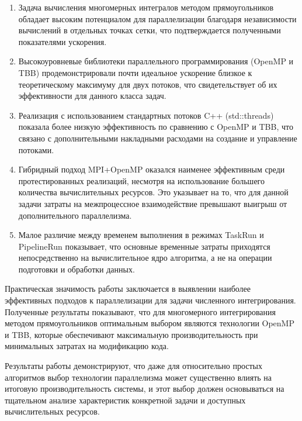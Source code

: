 \documentclass[a4paper,12pt]{article}
\begin{document}
  \begin{enumerate}
    \item Задача вычисления многомерных интегралов методом прямоугольников обладает высоким потенциалом для параллелизации благодаря независимости вычислений в отдельных точках сетки, что подтверждается полученными показателями ускорения.
    \item Высокоуровневые библиотеки параллельного программирования (OpenMP и TBB) продемонстрировали почти идеальное ускорение близкое к теоретическому максимуму для двух потоков, что свидетельствует об их эффективности для данного класса задач.
    \item Реализация с использованием стандартных потоков C++ (std::threads) показала более низкую эффективность по сравнению с OpenMP и TBB, что связано с дополнительными накладными расходами на создание и управление потоками.
    \item Гибридный подход MPI+OpenMP оказался наименее эффективным среди протестированных реализаций, несмотря на использование большего количества вычислительных ресурсов. Это указывает на то, что для данной задачи затраты на межпроцессное взаимодействие превышают выигрыш от дополнительного параллелизма.
    \item Малое различие между временем выполнения в режимах TaskRun и PipelineRun показывает, что основные временные затраты приходятся непосредственно на вычислительное ядро алгоритма, а не на операции подготовки и обработки данных.
  \end{enumerate}

  Практическая значимость работы заключается в выявлении наиболее эффективных подходов к параллелизации для задачи численного интегрирования.
  Полученные результаты показывают, что для многомерного интегрирования методом прямоугольников оптимальным выбором являются технологии OpenMP и TBB, которые обеспечивают максимальную производительность при минимальных затратах на модификацию кода.

  Результаты работы демонстрируют, что даже для относительно простых алгоритмов выбор технологии параллелизма может существенно влиять на итоговую производительность системы, и этот выбор должен основываться на тщательном анализе характеристик конкретной задачи и доступных вычислительных ресурсов.
  \newpage
\end{document}
